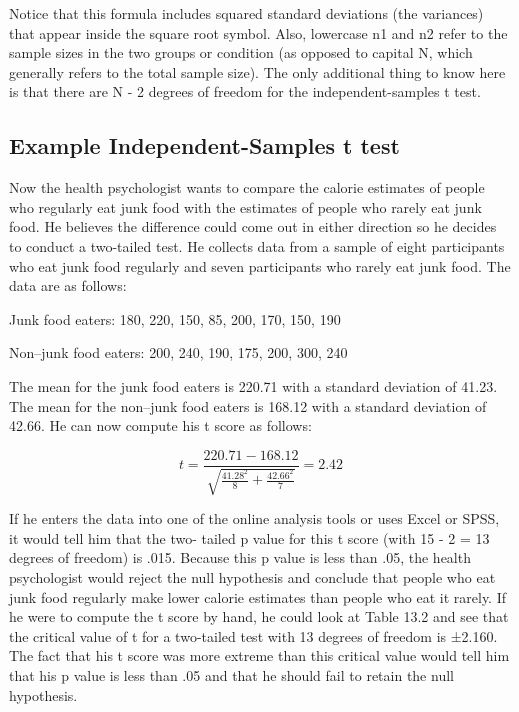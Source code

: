 
Notice that this formula includes squared standard deviations (the variances) that appear inside the square root symbol. Also, lowercase n1 and n2 refer to the sample sizes in the two groups or condition (as opposed to capital N, which generally refers to the total sample size). The only additional thing to know here is that there are N - 2 degrees of freedom for the independent-samples t test.


\subsection{Example Independent-Samples t test}

Now the health psychologist wants to compare the calorie estimates of people who regularly eat junk food with the estimates of people who rarely eat junk food. He believes the difference could come out in either direction so he decides to conduct a two-tailed test. He collects data from a sample of eight participants who eat junk food regularly and seven participants who rarely eat junk food. The data are as follows:


\begin{kframe}
Junk food eaters: 180, 220, 150, 85, 200, 170, 150, 190

\end{kframe}

\begin{kframe}
Non–junk food eaters: 200, 240, 190, 175, 200, 300, 240

\end{kframe}

The mean for the junk food eaters is 220.71 with a standard deviation of 41.23. The mean for the non–junk food eaters is 168.12 with a standard deviation of 42.66. He can now compute his t score as follows:


\begin{equation}
t = \frac{220.71-168.12}{ \sqrt{ \frac{41.28^2}{8} + \frac{42.66^2}{7} }} = 2.42
\end{equation}

If he enters the data into one of the online analysis tools or uses Excel or SPSS, it would tell him that the two- tailed p value for this t score (with 15 - 2 = 13 degrees of freedom) is .015. Because this p value is less than .05, the health psychologist would reject the null hypothesis and conclude that people who eat junk food regularly make lower calorie estimates than people who eat it rarely. If he were to compute the t score by hand, he could look at Table 13.2 and see that the critical value of t for a two-tailed test with 13 degrees of freedom is ±2.160. The fact that his t score was more extreme than this critical value would tell him that his p value is less than .05 and that he should fail to retain the null hypothesis.


